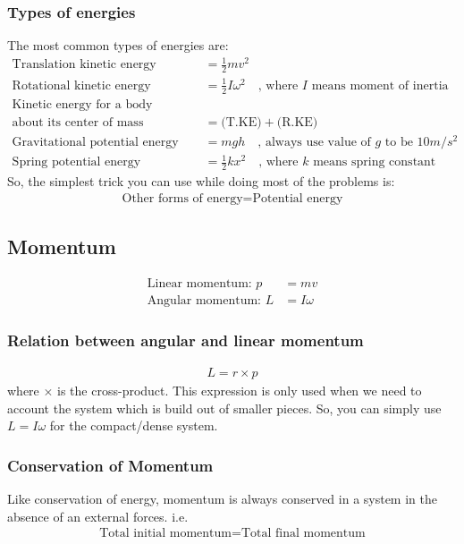 \documentclass[12pt,a4paper]{article}
\begin{document}
\subsubsection{Types of energies}
The most common types of energies are:
\begin{align}
\text{Translation kinetic energy (T.KE)} &= \frac{1}{2}m v^{2} \\
\text{Rotational kinetic energy (R.KE)} &= \frac{1}{2} I \omega^{2} \quad \text{, where $I$ means moment of inertia}\\
\text{Kinetic energy for a body }& \nonumber\\
\text{about its center of mass} &= \text{(T.KE)} + \text{(R.KE)} \\
\text{Gravitational potential energy} &= mgh \quad \text{, always use value of $g$ to be $10m/s^{2}$} \\
\text{Spring potential energy} &= \frac{1}{2}k x^{2} \quad \text{, where $k$ means spring constant}
\end{align}
So, the simplest trick you can use while doing most of the problems is:
\begin{align*}
\text{Other forms of energy} = \text{Potential energy}
\end{align*}

\subsection{Momentum}
\begin{align*}
\text{Linear momentum: } p &= mv \\
\text{Angular momentum: } L &= I\omega
\end{align*}

\subsubsection{Relation between angular and linear momentum}
\begin{align}
L = r \times p
\end{align}
where $\times$ is the cross-product. This expression is only used when we need to account the system which is build out of smaller pieces. So, you can simply use $ L = I\omega$ for the compact/dense system.

\subsubsection{Conservation of Momentum}
Like conservation of energy, momentum is always conserved in a system in the absence of an external forces. i.e.
\begin{align*}
\text{Total initial momentum} = \text{Total final momentum}
\end{align*}
\end{document}
